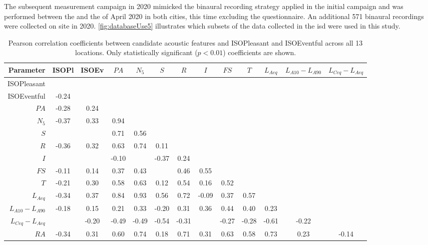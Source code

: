    The subsequent measurement campaign in 2020 mimicked the binaural recording strategy applied in the initial campaign and was performed between the  and the  of April 2020 in both cities, this time excluding the questionnaire. An additional 571 binaural recordings were collected on site in 2020. \cref{fig:databaseUse5} illustrates which subsets of the data collected in the \gls{isd} were used in this study.


\begin{table}
\centering
\caption{Pearson correlation coefficients between candidate acoustic features and ISOPleasant and ISOEventful across all 13 locations. Only statistically significant ($p < 0.01$) coefficients are shown. \label{tab:corr}}
\begin{tabular}{r|cccccccccccc} 
\toprule
\textbf{Parameter} & ISOPl & ISOEv & $PA$ & $N_5$ & $S$ & $R$ & $I$ & $FS$ & $T$ & $L_{Aeq}$ & $L_{A10}-L_{A90}$ & $L_{Ceq}-L_{Aeq}$ \\ 
\midrule
ISOPleasant &  &  &  &  &  &  &  &  &  &  &  &  \\
ISOEventful & -0.24 &  &  &  &  &  &  &  &  &  &  &  \\
$PA$ & -0.28 & 0.24 &  &  &  &  &  &  &  &  &  &  \\
$N_5$ & -0.37 & 0.33 & 0.94 &  &  &  &  &  &  &  &  &  \\
$S$ &  &  & 0.71 & 0.56 &  &  &  &  &  &  &  &  \\
$R$ & -0.36 & 0.32 & 0.63 & 0.74 & 0.11 &  &  &  &  &  &  &  \\
$I$ &  &  & -0.10 &  & -0.37 & 0.24 &  &  &  &  &  &  \\
$FS$ & -0.11 & 0.14 & 0.37 & 0.43 &  & 0.46 & 0.55 &  &  &  &  &  \\
$T$ & -0.21 & 0.30 & 0.58 & 0.63 & 0.12 & 0.54 & 0.16 & 0.52 &  &  &  &  \\
$L_{Aeq}$ & -0.34 & 0.37 & 0.84 & 0.93 & 0.56 & 0.72 & -0.09 & 0.37 & 0.57 &  &  &  \\
$L_{A10}-L_{A90}$ & -0.18 & 0.15 & 0.21 & 0.33 & -0.20 & 0.31 & 0.36 & 0.44 & 0.40 & 0.23 &  &  \\
$L_{Ceq}-L_{Aeq}$ &  & -0.20 & -0.49 & -0.49 & -0.54 & -0.31 &  & -0.27 & -0.28 & -0.61 & -0.22 &  \\
$RA$ & -0.34 & 0.31 & 0.60 & 0.74 & 0.18 & 0.71 & 0.31 & 0.63 & 0.58 & 0.73 & 0.23 & -0.14 \\
\bottomrule
\end{tabular}
\end{table}

